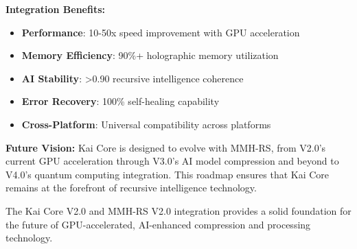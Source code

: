 \documentclass[12pt,a4paper]{article}
\begin{document}
\textbf{Integration Benefits:}
\begin{itemize}
    \item \textbf{Performance}: 10-50x speed improvement with GPU acceleration
    \item \textbf{Memory Efficiency}: 90\%+ holographic memory utilization
    \item \textbf{AI Stability}: >0.90 recursive intelligence coherence
    \item \textbf{Error Recovery}: 100\% self-healing capability
    \item \textbf{Cross-Platform}: Universal compatibility across platforms
\end{itemize}

\textbf{Future Vision:}
Kai Core is designed to evolve with MMH-RS, from V2.0's current GPU acceleration through V3.0's AI model compression and beyond to V4.0's quantum computing integration. This roadmap ensures that Kai Core remains at the forefront of recursive intelligence technology.

The Kai Core V2.0 and MMH-RS V2.0 integration provides a solid foundation for the future of GPU-accelerated, AI-enhanced compression and processing technology.
\end{document}
